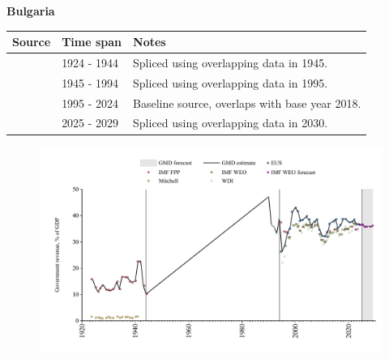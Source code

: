 \documentclass[12pt,a4paper,landscape]{article}
\begin{document}
\begin{adjustbox}{max totalsize={\paperwidth}{\paperheight},center}
\begin{minipage}[t][\textheight][t]{\textwidth}
\vspace*{0.5cm}
{}
\begin{center}
{\Large\bfseries Bulgaria}
\end{center}
\vspace{0.5cm}
\begin{table}[H]
\centering
\small
\begin{tabular}{|l|l|l|}
\hline
\textbf{Source} & \textbf{Time span} & \textbf{Notes} \\
\hline
\rowcolor{white}\cite{IMF_FPP}& 1924 - 1944 &Spliced using overlapping data in 1945.\\
\rowcolor{lightgray}\cite{WDI}& 1945 - 1994 &Spliced using overlapping data in 1995.\\
\rowcolor{white}\cite{EUS}& 1995 - 2024 &Baseline source, overlaps with base year 2018.\\
\rowcolor{lightgray}\cite{IMF_WEO_forecast}& 2025 - 2029 &Spliced using overlapping data in 2030.\\
\hline
\end{tabular}
\end{table}
\begin{figure}[H]
\centering
\includegraphics[width=\textwidth,height=0.6\textheight,keepaspectratio]{graphs/BGR_govrev_GDP.pdf}
\end{figure}
\end{minipage}
\end{adjustbox}
\end{document}
